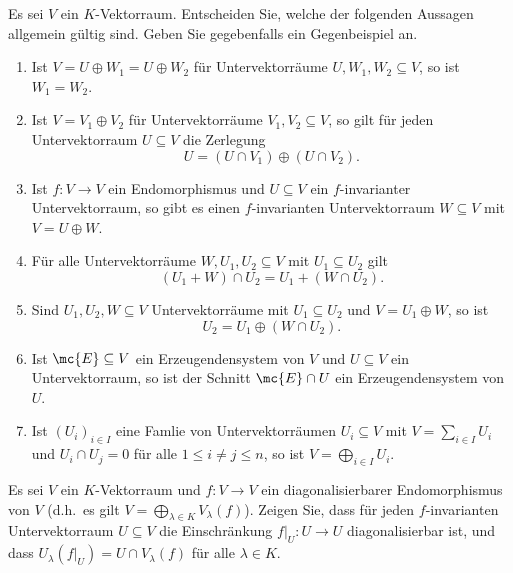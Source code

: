 \begin{question}
  Es sei $V$ ein $K$-Vektorraum.
  Entscheiden Sie, welche der folgenden Aussagen allgemein gültig sind.
  Geben Sie gegebenfalls ein Gegenbeispiel an.
  \begin{enumerate}[leftmargin=*]
    \item
      Ist $V = U \oplus W_1 = U \oplus W_2$ für Untervektorräume $U, W_1, W_2 \subseteq V$, so ist $W_1 = W_2$.
    \item
      Ist $V = V_1 \oplus V_2$ für Untervektorräume $V_1, V_2 \subseteq V$, so gilt für jeden Untervektorraum $U \subseteq V$ die Zerlegung
      \[
        U = (U \cap V_1) \oplus (U \cap V_2).
      \]
    \item
      Ist $f \colon V \to V$ ein Endomorphismus und $U \subseteq V$ ein $f$-invarianter Untervektorraum, so gibt es einen $f$-invarianten Untervektorraum $W \subseteq V$ mit $V = U \oplus W$.
    \item
      Für alle Untervektorräume $W, U_1, U_2 \subseteq V$ mit $U_1 \subseteq U_2$ gilt
      \[
        (U_1 + W) \cap U_2 =  U_1 + (W \cap U_2).
      \]
    \item
      Sind $U_1, U_2, W \subseteq V$ Untervektorräume mit $U_1 \subseteq U_2$ und $V = U_1 \oplus W$, so ist
      \[
        U_2 = U_1 \oplus (W \cap U_2).
      \]
    \item
      Ist $\mc{E} \subseteq V$ ein Erzeugendensystem von $V$ und $U \subseteq V$ ein Untervektorraum, so ist der Schnitt $\mc{E} \cap U$ ein Erzeugendensystem von $U$.
    \item
      Ist $(U_i)_{i \in I}$ eine Famlie von Untervektorräumen $U_i \subseteq V$ mit $V = \sum_{i \in I} U_i$ und $U_i \cap U_j = 0$ für alle $1 \leq i \neq j \leq n$, so ist $V = \bigoplus_{i \in I} U_i$.
  \end{enumerate}
\end{question}


\begin{question}
  Es sei $V$ ein $K$-Vektorraum und $f \colon V \to V$ ein diagonalisierbarer Endomorphismus von $V$ (d.h.\ es gilt \mbox{$V = \bigoplus_{\lambda \in K} V_\lambda(f)$}).
  Zeigen Sie, dass für jeden $f$-invarianten Untervektorraum $U \subseteq V$ die Einschränkung $f|_U \colon U \to U$ diagonalisierbar ist, und dass $U_\lambda(f|_U) = U \cap V_\lambda(f)$ für alle $\lambda \in K$.
\end{question}


